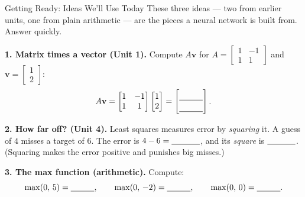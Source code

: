 \documentclass[10pt]{article}
\begin{document}
\namedateperiod

\vspace{0.12in}

\begin{notesbox}{Getting Ready: Ideas We'll Use Today}
\small These three ideas --- two from earlier units, one from plain arithmetic --- are the pieces a
neural network is built from. Answer quickly.

\vspace{4pt}
\textbf{1. Matrix times a vector (Unit 1).} Compute $A\mathbf{v}$ for
$A=\begin{bmatrix} 1 & -1 \\ 1 & 1 \end{bmatrix}$ and $\mathbf{v}=\begin{bmatrix} 1 \\ 2 \end{bmatrix}$:
\[
  A\mathbf{v}=\begin{bmatrix} 1 & -1 \\ 1 & 1 \end{bmatrix}\begin{bmatrix} 1 \\ 2 \end{bmatrix}
  = \begin{bmatrix}\rule{0pt}{1.1em}\blank{1.0cm}\\[2pt]\blank{1.0cm}\end{bmatrix}.
\]

\vspace{4pt}
\textbf{2. How far off? (Unit 4).} Least squares measures error by \emph{squaring} it. A guess of $4$
misses a target of $6$. The error is $4-6=\blank{1.2cm}$, and its \emph{square} is $\blank{1.2cm}$.
(Squaring makes the error positive and punishes big misses.)

\vspace{4pt}
\textbf{3. The max function (arithmetic).} Compute:
\[
  \max(0,\,5)=\blank{1.0cm},\qquad \max(0,\,-2)=\blank{1.0cm},\qquad \max(0,\,0)=\blank{1.0cm}.
\]
\end{notesbox}
\end{document}

